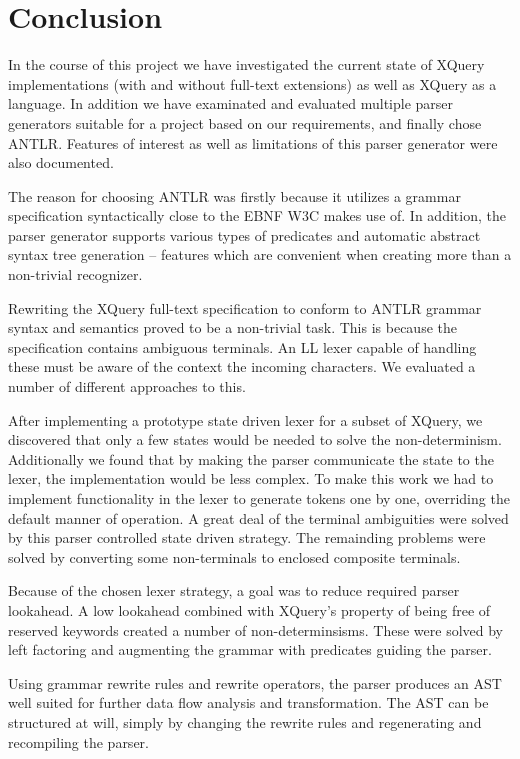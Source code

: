 \chapter{Conclusion}
\label{chapter:conclusion}

In the course of this project we have investigated the current state of XQuery
implementations (with and without full-text extensions) as well as XQuery as a
language. In addition we have examinated and evaluated multiple parser
generators suitable for a project based on our requirements, and finally chose
ANTLR. Features of interest as well as limitations of this parser generator
were also documented.

The reason for choosing ANTLR was firstly because it utilizes a grammar
specification syntactically close to the EBNF W3C makes use of. In addition,
the parser generator supports various types of predicates and automatic
abstract syntax tree generation -- features which are convenient when
creating more than a non-trivial recognizer.   

Rewriting the XQuery full-text specification to conform to ANTLR grammar syntax
and semantics proved to be a non-trivial task. This is because the
specification contains ambiguous terminals. An LL lexer capable of handling
these must be aware of the context the incoming characters. We evaluated a
number of different approaches to this.

After implementing a prototype state driven lexer for a subset of XQuery, we
discovered that only a few states would be needed to solve the non-determinism.
Additionally we found that by making the parser communicate the state to the
lexer, the implementation would be less complex. To make this work we had to
implement functionality in the lexer to generate tokens one by one, overriding
the default manner of operation. A great deal of the terminal ambiguities were
solved by this parser controlled state driven strategy. The remainding problems
were solved by converting some non-terminals to enclosed composite terminals.  

Because of the chosen lexer strategy, a goal was to reduce required parser
lookahead. A low lookahead combined with XQuery's property of being free of 
reserved keywords created a number of non-determinsisms. These were solved by
left factoring and augmenting the grammar with predicates guiding the parser. 

Using grammar rewrite rules and rewrite operators, the parser produces an AST
well suited for further data flow analysis and transformation. The AST can be
structured at will, simply by changing the rewrite rules and regenerating and
recompiling the parser.   

